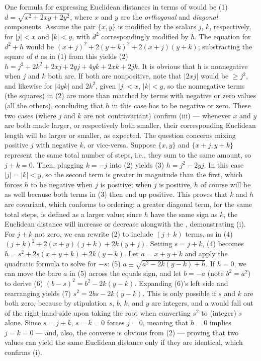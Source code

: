 One formula for expressing Euclidean distances 
in terms of \MCH{} would be (1) $d = \sqrt{x^2 + 2xy + 2y^2}$, 
where $x$ and $y$ are the \MCH{} \textit{orthogonal} 
and \textit{diagonal} components.   
Assume the pair $\{x, y\}$ is modified by the 
scalars $j$, $k$, respectively, for $|j| < x$ and $|k| < y$, 
with $d^2$ correspondingly 
modified by $h$.  The equation for $d^2 + h$ would be 
$(x + j)^2 + 2(y + k)^2 + 2(x + j)(y + k)$; substracting the 
square of $d$ as in (1) from this 
yields (2) $h = j^2 + 2k^2 + 2xj + 2yj + 4yk +2xk + 2jk$.  
It is obvious that h is nonnegative when $j$ and $k$ 
both are.  If both are nonpositive, note that 
$|2xj|$ would be $\geq{}j^2$, and likewise 
for $|4yk|$ and $2k^2$, given $|j| < x$, $|k| < y$, 
so the nonnegative terms (the squares) in (2) are more than 
matched by terms with negative or zero values (all the others), 
concluding that $h$ in this case has to be negative or zero.  
These two cases (where $j$ and $k$ are not contravariant) 
confirm (iii) ---  whenever $x$ and $y$ are both made larger, or 
respectively both smaller, their corresponding Euclidean 
length will be larger or smaller, as expected.  
The question concerns mixing positive $j$ with negative $k$, 
or vice-versa.  Suppose $\{x, y\}$ and $\{x + j, y + k\}$ represent 
the same total number of steps, i.e., they sum 
to the same amount, so $j + k = 0$.  Then, plugging 
$k = -j$ into (2) yields (3) $h = j^2 - 2yj$.  
In this case $|j| = |k| < y$, so the second 
term is greater in magnitude than the first, which 
forces $h$ to be negative when $j$ is positive; 
when $j$ is positive, $h$ of course will be as well 
because both terms in (3) then end up positive.  
This proves that $k$ and $h$ are covariant, which 
conforms to \MCH{} ordering: a greater diagonal term, 
for the same total steps, is defined as a larger 
\MCH{} value; since $h$ have the same sign as $k$, 
the Euclidean distance will increase or decrease alongwith 
the \MCH{}, demonstrating (i).  
For $j + k$ not zero, we can rewrite (2) to include 
$(j + k)$ terms, as in (4) $(j + k)^2 + 2(x + y)(j + k) + 2k(y + j)$.
Setting $s = j + k$, (4) becomes $h = s^2 + 2s(x+y+k) + 2k(y - k)$.
Let $a = x+y+k$ and apply the quadratic formula to solve for 
$-s$: (5) $a \pm{} \sqrt{a^2-2k(y-k)+h}$.  If $h = 0$, we can move the bare $a$ 
in (5) across the equals sign, and let $b = -a$ (note $b^2=a^2$) 
to derive (6) $(b-s)^2=b^2-2k(y-k)$.  Expanding (6)'s left side 
and rearranging yields (7) $s^2=2bs-2k(y-k)$.  This is only possible 
if $s$ and $k$ are both zero, because by stipulation $s$, $b$, $k$, and 
$y$ are integers, and a  would fall out of the right-hand-side 
upon taking the root when converting $s^2$ to (integer) $s$ alone.  
Since $s = j + k$, $s = k = 0$ forces $j = 0$, meaning that 
$h = 0$ implies $j = k = 0$ --- and, also, 
the converse is obvious from (2) --- proving that 
two \MCH{} values can yield the same Euclidean 
distance only if they are identical, which confirms (i).   


